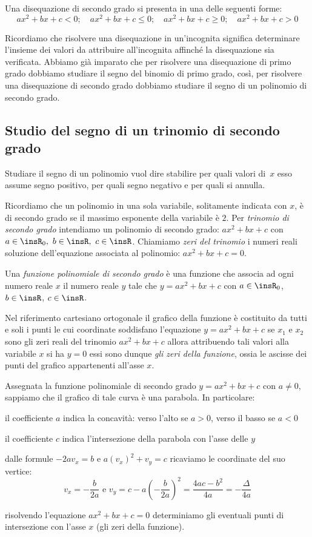 Una disequazione di secondo grado si presenta in una delle seguenti forme:
\[ax^2+bx+c<0;\quad ax^2+bx+c\le 0;\quad ax^2+bx+c\ge0;\quad ax^2+bx+c> 0\]

Ricordiamo che risolvere una disequazione in un'incognita significa determinare 
l'insieme dei valori da attribuire all'incognita affinché la disequazione sia 
verificata.
Abbiamo già imparato che per risolvere una disequazione di primo grado dobbiamo 
studiare il segno del binomio di primo grado, così, per risolvere una 
disequazione di secondo grado dobbiamo studiare il segno di un polinomio di 
secondo grado.

\subsection{Studio del segno di un trinomio di secondo grado}
\label{sec:diseq_trinomio}

Studiare il segno di un polinomio vuol dire stabilire per quali valori 
di~$x$ esso assume segno positivo, per quali segno negativo e per quali 
si annulla.

Ricordiamo che un polinomio in una sola variabile, solitamente indicata con 
$x$, 
è di secondo grado se il massimo esponente della variabile è $2$. 
Per \emph{trinomio di secondo grado} intendiamo un polinomio di secondo grado: 
$ax^2+bx+c$ con $a\in \insR_{0},~b\in \insR,~c\in \insR$. 
Chiamiamo \emph{zeri del trinomio} i numeri reali soluzione dell'equazione 
associata al polinomio: $ax^2+bx+c=0$.

\begin{definizione}
Una \emph{funzione polinomiale di secondo grado} è una funzione che associa ad 
ogni numero reale $x$ il numero reale $y$ tale che
$y=ax^2+bx+c$ con $a\in \insR_{0}$, $b\in \insR$, $c\in \insR$.
\end{definizione}

Nel riferimento cartesiano ortogonale il grafico della funzione è costituito da 
tutti e soli i punti le cui coordinate soddisfano l'equazione $y=ax^2+bx+c$ se 
$x_1$ e $x_2$ sono gli zeri reali del trinomio $ax^2+bx+c$ allora attribuendo 
tali valori alla variabile $x$ si ha $y=0$ essi sono dunque \emph{gli zeri 
della 
funzione}, ossia le ascisse dei punti del grafico appartenenti all'asse $x$.

Assegnata la funzione polinomiale di secondo grado $y={ax}^2+{bx}+c$ con 
$a\neq 0$, sappiamo che il grafico di tale curva è una parabola. 
In particolare:
\begin{itemize*}
\item il coefficiente $a$ indica la concavità: verso l'alto se $a>0$, verso il 
basso se $a<0$
\item il coefficiente $c$ indica l'intersezione della parabola con l'asse delle 
$y$
\item dalle formule $-2av_x=b$ e $a(v_x)^2+v_y=c$ ricaviamo le coordinate del 
suo vertice:
\[v_x=-\frac b{2a} \text{ e } 
  v_y=c-a\left(-\frac{b}{2a}\right)^2=\frac{4ac-b^2}{4a}=-\frac{\Delta }{4a}\]
\item risolvendo l'equazione ${ax}^2+{bx}+c=0$ determiniamo gli eventuali punti 
di intersezione con l'asse $x$ (gli zeri della funzione).
\end{itemize*}

